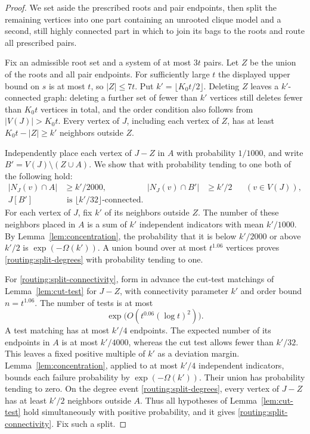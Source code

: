 \begin{proof}
We set aside the prescribed roots and pair endpoints, then split the
remaining vertices into one part containing an unrooted clique model
and a second, still highly connected part in which to join its bags to
the roots and route all prescribed pairs.

Fix an admissible root set and a system of at most $3t$ pairs.
Let $Z$ be the union of the roots and all pair endpoints.  For sufficiently
large $t$ the displayed upper bound on $s$ is at most $t$, so $|Z|\le7t$.
Put $k'=\lfloor K_0t/2\rfloor$.  Deleting $Z$ leaves a $k'$-connected
graph: deleting a further set of fewer than $k'$ vertices still deletes
fewer than $K_0t$ vertices in total, and the order condition also follows
from $|V(J)|>K_0t$.  Every vertex of $J$, including each vertex of $Z$,
has at least $K_0t-|Z|\ge k'$ neighbors outside $Z$.

Independently place each vertex of $J-Z$ in $A$ with probability $1/1000$,
and write $B'=V(J)\setminus(Z\cup A)$.  We show that with probability
tending to one both of the following hold:
\begin{align}
 |N_J(v)\cap A|&\ge k'/2000,
 &|N_J(v)\cap B'|&\ge k'/2 &&(v\in V(J)),
 \label{routing:split-degrees}\\
 J[B']&\text{ is }\lfloor k'/32\rfloor\text{-connected}.
 \label{routing:split-connectivity}
\end{align}
For each vertex of $J$, fix $k'$ of its neighbors outside $Z$.
The number of these neighbors placed in $A$ is a sum of $k'$
independent indicators with mean $k'/1000$.  By
Lemma~\ref{lem:concentration}, the probability that it is below
$k'/2000$ or above $k'/2$ is $\exp(-\Omega(k'))$.
A union bound over at most $t^{1.06}$ vertices proves
\eqref{routing:split-degrees} with probability tending to one.

For \eqref{routing:split-connectivity}, form in advance the cut-test
matchings of Lemma~\ref{lem:cut-test} for $J-Z$, with connectivity
parameter $k'$ and order bound $n=t^{1.06}$.  The number of tests is at most
\[
 \exp\!\bigl(O(t^{0.06}(\log t)^2)\bigr).
\]
A test matching has at most $k'/4$ endpoints.  The expected number of
its endpoints in $A$ is at most $k'/4000$, whereas the cut test allows
fewer than $k'/32$.  This leaves a fixed positive multiple of $k'$ as
a deviation margin.  Lemma~\ref{lem:concentration}, applied to at most
$k'/4$ independent indicators, bounds each failure probability by
$\exp(-\Omega(k'))$.  Their union has probability tending to zero.
On the degree event \eqref{routing:split-degrees}, every vertex of
$J-Z$ has at least $k'/2$ neighbors outside $A$.  Thus all hypotheses
of Lemma~\ref{lem:cut-test} hold simultaneously with positive probability,
and it gives \eqref{routing:split-connectivity}.  Fix such a split.


\end{proof}
